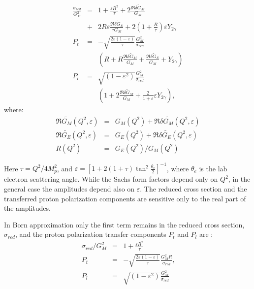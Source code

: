 \begin{eqnarray}
\frac{\sigma _{red}}{G_M^2}&=& 1+\frac{\varepsilon R^2}{\tau }+2\frac{\Re\delta \tilde{G}_M}{G_M} \nonumber \\
&+& 2R\varepsilon \frac{\Re\delta \tilde{G}_E}{\tau G_M}+ 2\left(1+\frac{R}{\tau }\right){ \varepsilon Y_{2\gamma }}
\label{eq:siggen}
\\
P_t&=&-\sqrt{\frac{2\varepsilon(1-\varepsilon)}{\tau}}
\frac{G_M^2}{\sigma _{red}}  \nonumber \\
& &\left(R+
R\frac{ \Re\delta \tilde{G}_M}{G_M}
+\frac{ \Re\delta \tilde{G}_E}{G_M}
+{ Y_{2\gamma }}\right)
\label{eq:ptgen}
\\
P_l&=&\sqrt{(1-\varepsilon ^2)}\frac{G_M^2}{\sigma _{red}} \nonumber \\
& &\left(1+2\frac{ \Re\delta \tilde{G}_M}{G_M}+\frac{2}{1+\varepsilon }{ \varepsilon Y_{2\gamma }}\right)  %
\label{eq:plgen}
\mbox{,}
\end{eqnarray}
where:
\begin{eqnarray}
\Re\tilde{G_M}(Q^2,\varepsilon)&=&G_M(Q^2)+\Re\delta \tilde{G_M}(Q^2,\varepsilon)  \\ %
\label{eq:regm}
\Re\tilde{G_E}(Q^2,\varepsilon)&=&G_E(Q^2)+\Re\delta \tilde{G_E}(Q^2, \varepsilon) 
\label{eq:rege} \\  %
R(Q^2)&=&G_E(Q^2)/G_M(Q^2) \nonumber 
\end{eqnarray}

Here $\tau=Q^{2}/4M_{p}^{2}$, 
and $\varepsilon =[1+2(1+\tau)\tan^2\frac{\theta_e}{2}]^{-1}$,
where  $\theta_e$ is the lab electron scattering angle.
While the Sachs form factors depend only on $Q^2$, in the general case the
amplitudes depend also on $\varepsilon$.
The  reduced cross section
and the transferred proton polarization components are sensitive only to the real part
of the amplitudes. 

In Born approximation only the first term remains in the reduced cross 
section, $\sigma _{red}$, and the
proton polarization transfer components $P_t$ and $P_l$ are :
\begin{eqnarray}
{\sigma _{red}}/{G_M^2}&=&
1+\frac{\varepsilon R^2}{\tau }
\label{eq:sigborn}
\\
P_t&=&-\sqrt{\frac{2\varepsilon(1-\varepsilon)}{\tau}}
\frac{G_M^2R}{\sigma _{red}}
\label{eq:ptgen}
\mbox{,}  \\
P_l&=&\sqrt{(1-\varepsilon ^2)}
\frac{G_M^2}{\sigma _{red}}
\label{eq:pborn}
\end{eqnarray}


